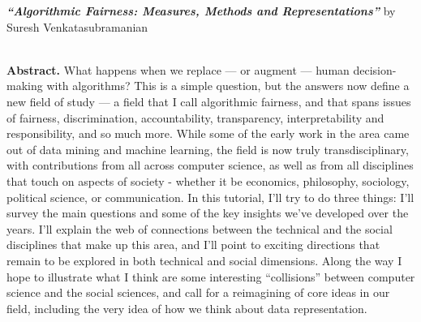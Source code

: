 \clearpage

{
\center
\textbf{\emph{``Algorithmic Fairness: Measures, Methods and Representations''}} by Suresh Venkatasubramanian ~\\~
}

\textbf{Abstract.} What happens when we replace — or augment — human decision-making with algorithms? This is a simple question, but the answers now define a new field of study — a field that I call algorithmic fairness, and that spans issues of fairness, discrimination, accountability, transparency, interpretability and responsibility, and so much more. While some of the early work in the area came out of data mining and machine learning, the field is now truly transdisciplinary, with contributions from all across computer science, as well as from all disciplines that touch on aspects of society - whether it be economics, philosophy, sociology, political science, or communication. In this tutorial, I’ll try to do three things: I'll survey the main questions and some of the key insights we’ve developed over the years. I'll explain the web of connections between the technical and the social disciplines that make up this area, and I'll point to exciting directions that remain to be explored in both technical and social dimensions. Along the way I hope to illustrate what I think are some interesting ``collisions'' between computer science and the social sciences, and call for a reimagining of core ideas in our field, including the very idea of how we think about data representation.

\vspace{2mm}






